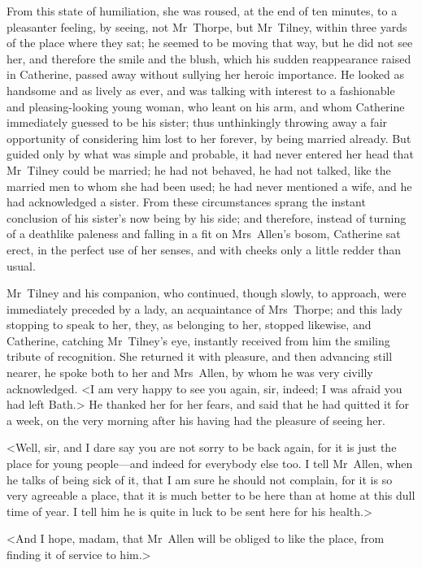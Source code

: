  From this state of humiliation, she was roused, at the end of ten minutes, to a pleasanter feeling, by seeing, not Mr~Thorpe, but Mr~Tilney, within three yards of the place where they sat; he seemed to be moving that way, but he did not see her, and therefore the smile and the blush, which his sudden reappearance raised in Catherine, passed away without sullying her heroic importance. He looked as handsome and as lively as ever, and was talking with interest to a fashionable and pleasing-looking young woman, who leant on his arm, and whom Catherine immediately guessed to be his sister; thus unthinkingly throwing away a fair opportunity of considering him lost to her forever, by being married already. But guided only by what was simple and probable, it had never entered her head that Mr~Tilney could be married; he had not behaved, he had not talked, like the married men to whom she had been used; he had never mentioned a wife, and he had acknowledged a sister. From these circumstances sprang the instant conclusion of his sister's now being by his side; and therefore, instead of turning of a deathlike paleness and falling in a fit on Mrs~Allen's bosom, Catherine sat erect, in the perfect use of her senses, and with cheeks only a little redder than usual. 

 Mr~Tilney and his companion, who continued, though slowly, to approach, were immediately preceded by a lady, an acquaintance of Mrs~Thorpe; and this lady stopping to speak to her, they, as belonging to her, stopped likewise, and Catherine, catching Mr~Tilney's eye, instantly received from him the smiling tribute of recognition. She returned it with pleasure, and then advancing still nearer, he spoke both to her and Mrs~Allen, by whom he was very civilly acknowledged. <I am very happy to see you again, sir, indeed; I was afraid you had left Bath.> He thanked her for her fears, and said that he had quitted it for a week, on the very morning after his having had the pleasure of seeing her. 

 <Well, sir, and I dare say you are not sorry to be back again, for it is just the place for young people—and indeed for everybody else too. I tell Mr~Allen, when he talks of being sick of it, that I am sure he should not complain, for it is so very agreeable a place, that it is much better to be here than at home at this dull time of year. I tell him he is quite in luck to be sent here for his health.> 

 <And I hope, madam, that Mr~Allen will be obliged to like the place, from finding it of service to him.> 

